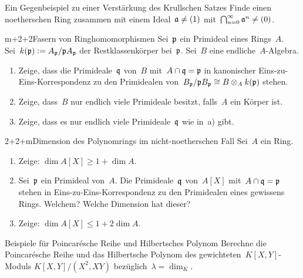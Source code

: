 \documentclass{uebblatt}
\begin{document}

\begin{aufgabe}{2}{Ein Gegenbeispiel zu einer Verstärkung des Krullschen Satzes}
Finde einen noetherschen Ring zusammen mit einem Ideal~$\mathfrak{a} \neq (1)$
mit~$\bigcap_{n=0}^\infty \mathfrak{a}^n \neq (0)$.
\end{aufgabe}

\begin{aufgabe}{m+2+2}{Fasern von Ringhomomorphismen}
Sei~$\mathfrak{p}$ ein Primideal eines Rings~$A$. Sei~$k(\mathfrak{p}) \vcentcolon= A_{\mathfrak{p}}/\mathfrak{p} A_{\mathfrak{p}}$
der Restklassenkörper bei~$\mathfrak{p}$. Sei~$B$ eine endliche~$A$-Algebra.
\begin{enumerate}
\item Zeige, dass die Primideale~$\mathfrak{q}$
von~$B$ mit~$A \cap \mathfrak{q} = \mathfrak{p}$ in kanonischer Eins-zu-Eins-Korrespondenz zu
den Primidealen von~$B_{\mathfrak{p}}/\mathfrak{p} B_{\mathfrak{p}} \cong B \otimes_A k(\mathfrak{p})$ stehen.
\item Zeige, dass~$B$ nur endlich
viele Primideale besitzt, falls~$A$ ein Körper ist.
\item Zeige, dass es nur endlich viele
Primideale~$\mathfrak{q}$ wie in~a) gibt.
\end{enumerate}
\end{aufgabe}

\begin{aufgabe}{2+2+m}{Dimension des Polynomrings im nicht-noetherschen Fall}
Sei~$A$ ein Ring.
\begin{enumerate}
\item Zeige: $\dim A[X] \geq 1 + \dim A$.
\item Sei~$\mathfrak{p}$ ein Primideal von~$A$. Die Primideale~$\mathfrak{q}$
von~$A[X]$ mit~$A \cap \mathfrak{q} = \mathfrak{p}$ stehen in Eins-zu-Eins-Korrespondenz zu den
Primidealen eines gewissens Rings. Welchem? Welche Dimension hat dieser?
\item Zeige: $\dim A[X] \leq 1 + 2 \dim A$.
\end{enumerate}
\end{aufgabe}

\begin{aufgabe}{3}{Beispiele für Poincarésche Reihe und Hilbertsches Polynom}
Berechne die Poincarésche Reihe und das Hilbertsche Polynom des
gewichteten~$K[X,Y]$-Moduls $K[X,Y]/(X^2, XY)$ bezüglich~$\lambda = \dim_K$.
\end{aufgabe}
\end{document}
